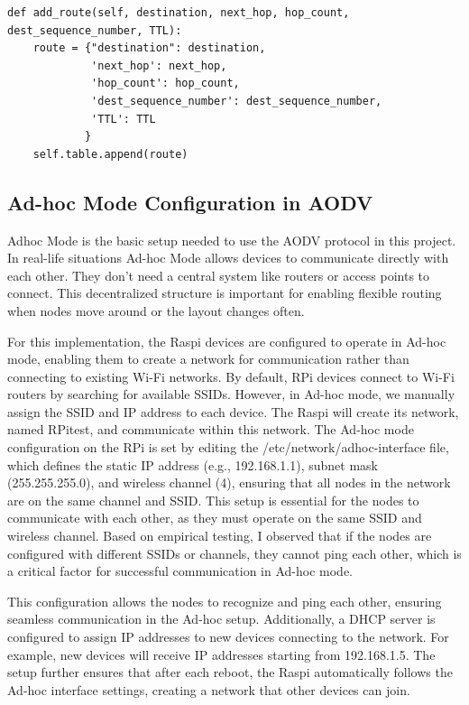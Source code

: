 \documentclass[]{nsm-thesis}
\begin{document}
\begin{lstlisting}[caption={Python code for the add\_route function}, label={lst:add_route}]
def add_route(self, destination, next_hop, hop_count, dest_sequence_number, TTL):
    route = {"destination": destination,
             'next_hop': next_hop,
             'hop_count': hop_count,
             'dest_sequence_number': dest_sequence_number,
             'TTL': TTL
            }
    self.table.append(route)
\end{lstlisting}

\subsection{Ad-hoc Mode Configuration in AODV}
Adhoc Mode is the basic setup needed to use the AODV protocol in this project. In real-life situations Ad-hoc Mode allows devices to communicate directly with each other. They don't need a central system like routers or access points to connect. This decentralized structure is important for enabling flexible routing when nodes move around or the layout changes often.

For this implementation, the Raspi devices are configured to operate in Ad-hoc mode, enabling them to create a network for communication rather than connecting to existing Wi-Fi networks. By default, RPi devices connect to Wi-Fi routers by searching for available SSIDs. However, in Ad-hoc mode, we manually assign the SSID and IP address to each device. The Raspi will create its network, named RPitest, and communicate within this network. The Ad-hoc mode configuration on the RPi is set by editing the /etc/network/adhoc-interface file, which defines the static IP address (e.g., 192.168.1.1), subnet mask (255.255.255.0), and wireless channel (4), ensuring that all nodes in the network are on the same channel and SSID. This setup is essential for the nodes to communicate with each other, as they must operate on the same SSID and wireless channel\cite{pyshine2025}. Based on empirical testing, I observed that if the nodes are configured with different SSIDs or channels, they cannot ping each other, which is a critical factor for successful communication in Ad-hoc mode.

This configuration allows the nodes to recognize and ping each other, ensuring seamless communication in the Ad-hoc setup. Additionally, a DHCP server is configured to assign IP addresses to new devices connecting to the network. For example, new devices will receive IP addresses starting from 192.168.1.5. The setup further ensures that after each reboot, the Raspi automatically follows the Ad-hoc interface settings, creating a network that other devices can join.
\end{document}
